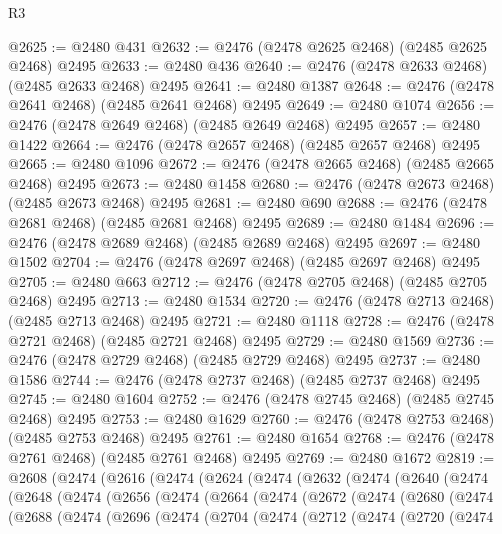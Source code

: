 \begin{lexlean}{R3}
\begin{coremodule}
@2625 := @2480 @431
@2632 := @2476 (@2478 @2625 @2468) (@2485 @2625 @2468) @2495
@2633 := @2480 @436
@2640 := @2476 (@2478 @2633 @2468) (@2485 @2633 @2468) @2495
@2641 := @2480 @1387
@2648 := @2476 (@2478 @2641 @2468) (@2485 @2641 @2468) @2495
@2649 := @2480 @1074
@2656 := @2476 (@2478 @2649 @2468) (@2485 @2649 @2468) @2495
@2657 := @2480 @1422
@2664 := @2476 (@2478 @2657 @2468) (@2485 @2657 @2468) @2495
@2665 := @2480 @1096
@2672 := @2476 (@2478 @2665 @2468) (@2485 @2665 @2468) @2495
@2673 := @2480 @1458
@2680 := @2476 (@2478 @2673 @2468) (@2485 @2673 @2468) @2495
@2681 := @2480 @690
@2688 := @2476 (@2478 @2681 @2468) (@2485 @2681 @2468) @2495
@2689 := @2480 @1484
@2696 := @2476 (@2478 @2689 @2468) (@2485 @2689 @2468) @2495
@2697 := @2480 @1502
@2704 := @2476 (@2478 @2697 @2468) (@2485 @2697 @2468) @2495
@2705 := @2480 @663
@2712 := @2476 (@2478 @2705 @2468) (@2485 @2705 @2468) @2495
@2713 := @2480 @1534
@2720 := @2476 (@2478 @2713 @2468) (@2485 @2713 @2468) @2495
@2721 := @2480 @1118
@2728 := @2476 (@2478 @2721 @2468) (@2485 @2721 @2468) @2495
@2729 := @2480 @1569
@2736 := @2476 (@2478 @2729 @2468) (@2485 @2729 @2468) @2495
@2737 := @2480 @1586
@2744 := @2476 (@2478 @2737 @2468) (@2485 @2737 @2468) @2495
@2745 := @2480 @1604
@2752 := @2476 (@2478 @2745 @2468) (@2485 @2745 @2468) @2495
@2753 := @2480 @1629
@2760 := @2476 (@2478 @2753 @2468) (@2485 @2753 @2468) @2495
@2761 := @2480 @1654
@2768 := @2476 (@2478 @2761 @2468) (@2485 @2761 @2468) @2495
@2769 := @2480 @1672
@2819 := @2608
    (@2474
      (@2616
        (@2474
          (@2624
            (@2474
              (@2632
                (@2474
                  (@2640
                    (@2474
                      (@2648
                        (@2474
                          (@2656
                            (@2474
                              (@2664
                                (@2474
                                  (@2672
                                    (@2474
                                      (@2680
                                        (@2474
                                          (@2688
                                            (@2474
                                              (@2696
                                                (@2474
                                                  (@2704
                                                    (@2474
                                                      (@2712
                                                        (@2474
                                                          (@2720
                                                            (@2474

\end{coremodule}
\end{lexlean}
